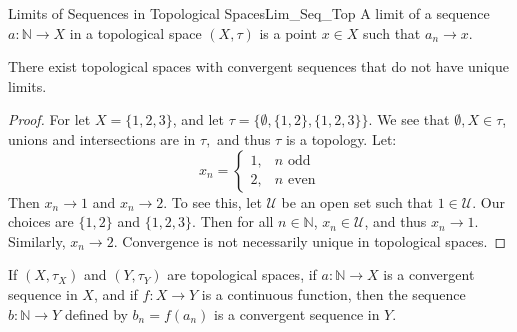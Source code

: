     \begin{ldefinition}{Limits of Sequences in Topological Spaces}{Lim_Seq_Top}
        A limit of a sequence $a:\mathbb{N}\rightarrow{X}$ in a topological
        space $(X,\tau)$ is a point $x\in{X}$ such that $a_{n}\rightarrow{x}$.
    \end{ldefinition}
    \begin{theorem}
        There exist topological spaces with convergent sequences that do not
        have unique limits.
    \end{theorem}
    \begin{proof}
        For let $X=\{1,2,3\}$, and let $\tau=\{\emptyset, \{1,2\},\{1,2,3\}\}$.
        We see that $\emptyset,X\in \tau$, unions and intersections are in
        $\tau,$ and thus $\tau$ is a topology. Let:
        \begin{equation}
            x_{n}=
            \begin{cases}
                1,&n\textrm{ odd}\\
                2,&n\textrm{ even}
            \end{cases}
        \end{equation}
        Then $x_n \rightarrow 1$ and $x_n \rightarrow 2$. To see this, let
        $\mathcal{U}$ be an open set such that $1\in \mathcal{U}$. Our choices
        are $\{1,2\}$ and $\{1,2,3\}$. Then for all $n\in \mathbb{N}$,
        $x_{n}\in\mathcal{U}$, and thus $x_{n}\rightarrow{1}$. Similarly,
        $x_n \rightarrow 2$. Convergence is not necessarily unique in
        topological spaces.
    \end{proof}
    \begin{theorem}
        If $(X,\tau_{X})$ and $(Y,\tau_{Y})$ are topological spaces, if
        $a:\mathbb{N}\rightarrow{X}$ is a convergent sequence in $X$, and if
        $f:X\rightarrow{Y}$ is a continuous function, then the sequence
        $b:\mathbb{N}\rightarrow{Y}$ defined by $b_{n}=f(a_{n})$ is a convergent
        sequence in $Y$.
    \end{theorem}
